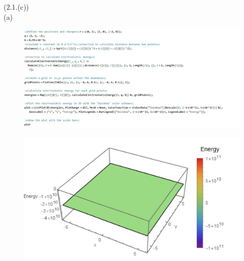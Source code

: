 \documentclass[journal,12pt,onecolumn]{IEEEtran}
\theoremstyle{remark}
\begin{document}
\newpage
(2.1.(c))\\
(a)\begin{figure}[H]
    \centering
     \includegraphics[scale=0.5]{figs/u2.1.a.1.jpeg}
    \caption{}    
    \label{fig:ishitha.em.fig1}
   \end{figure} 
   \begin{figure}[H]
    \centering
     \includegraphics[scale=0.5]{figs/u2.1.a.jpeg}
    \caption{}    
    \label{fig:ishitha.em.fig1}
   \end{figure} 
   
 \newpage
 
\end{document}
